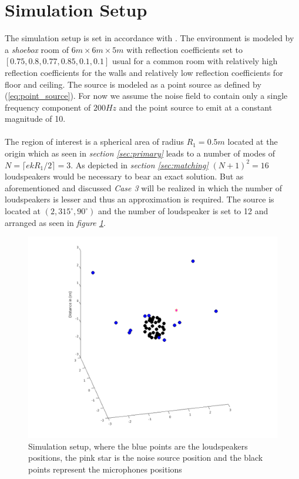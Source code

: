\section{Simulation Setup}
The simulation setup is set in accordance with \cite{Zhang2019}. The environment is modeled by a \textit{shoebox} room of $6m \times 6m \times 5m$ with reflection coefficients set to $[0.75,0.8,0.77,0.85,0.1,0.1]$ usual for a common room with relatively high reflection coefficients for the walls and relatively low reflection coefficients for floor and ceiling. The source is modeled as a point source as defined by (\ref{eq:point_source}). For now we assume the noise field to contain only a single frequency component of $200Hz$ and the point source to emit at a constant magnitude of 10.\\ \\
The region of interest is a spherical area of radius $R_1 = 0.5m$ located at the origin which as seen in \textit{section \ref{sec:primary}} leads to a number of modes of $N = \lceil ekR_1/2\rceil = 3$. As depicted in \textit{section \ref{sec:matching}} $(N+1)^2 = 16$ loudspeakers would be necessary to bear an exact solution. But as aforementioned and discussed \textit{Case 3} will be realized in which the number of loudspeakers is lesser and thus an approximation is required. The source is located at $(2, 315^\circ , 90^\circ)$ and the number of loudspeaker is set to 12 and arranged as seen in \textit{figure \ref{fig:setup}}.

\begin{figure}
    \centerline{\includegraphics[width=180mm,keepaspectratio]{LaTeX/images/plots/ANCSetup.png}}
    \caption{Simulation setup, where the blue points are the loudspeakers positions, the pink star is the noise source position and the black points represent the microphones positions}
    \label{fig:setup}
\end{figure}
\newpage


